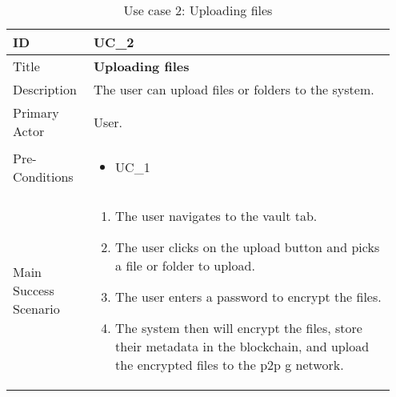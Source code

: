 \begin{longtable}{p{0.20\linewidth} | p{0.75\linewidth}}
  \caption{Use case 2: Uploading files}
  \label{tab:useCaseUpload}
  \\\toprule
  ID & UC\_2
  \\\midrule
  Title & \textbf{Uploading files}
  \\\hline
  Description & The user can upload files or folders to the system.
  \\\hline
  Primary Actor & User.
  \\\hline
  Pre-Conditions & {
    \begin{itemize}
    \item UC\_1
    \end{itemize}
  }\vspace*{-\baselineskip}
  \\\hline
  Main Success Scenario & {
    \begin{enumerate}
    \item The user navigates to the vault tab.
    \item The user clicks on the upload button and picks a file or folder to upload.
    \item The user enters a password to encrypt the files.
    \item The system then will encrypt the files, store their metadata in the blockchain, and upload the encrypted files to the \gls{p2p g} network.
    \end{enumerate}
  }\vspace*{-\baselineskip}
  \\\bottomrule
\end{longtable}

